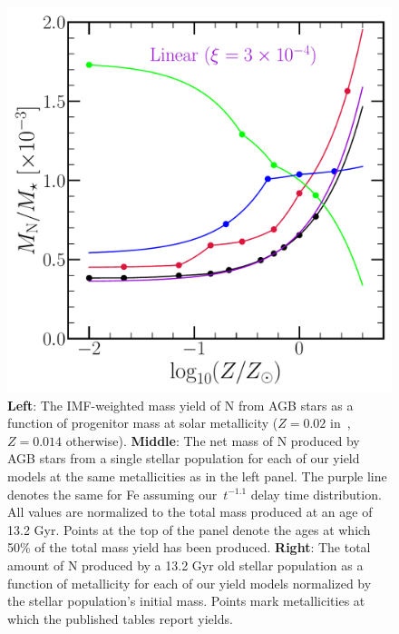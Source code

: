 \documentclass[ms.tex]{subfiles}
\begin{document}
\begin{figure}
\includegraphics[scale = 0.3]{ssp_production_metdep.pdf} 
\caption{ 
\textbf{Left}: The IMF-weighted mass yield of N from AGB stars as a function 
of progenitor mass at solar metallicity ($Z = 0.02$ in~\karakasten,~$Z = 0.014$ 
otherwise). 
\textbf{Middle}: The net mass of N produced by AGB stars from a single stellar 
population for each of our yield models at the same metallicities as in the 
left panel. 
The purple line denotes the same for Fe assuming our~$t^{-1.1}$ delay time 
distribution. 
All values are normalized to the total mass produced at an age of 13.2 Gyr. 
Points at the top of the panel denote the ages at which 50\% of the total mass 
yield has been produced. 
\textbf{Right}: The total amount of N produced by a 13.2 Gyr old stellar 
population as a function of metallicity for each of our yield models normalized 
by the stellar population's initial mass. 
Points mark metallicities at which the published tables report yields. 
} 
\label{fig:ssp} 
\end{figure} 
\end{document}
